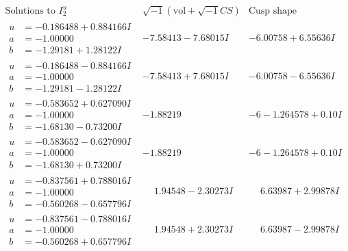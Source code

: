 \documentclass[1p]{elsarticle_modified}
\theoremstyle{definition}
\newcommand{\I}{\sqrt{-1}}
\begin{document}
$$\begin{array}{c|c|c}  
\text{Solutions to }I^u_{2}& \I (\text{vol} + \sqrt{-1}CS) & \text{Cusp shape}\\
 \hline 
\begin{aligned}
u &= -0.186488 + 0.884166 I \\
a &= -1.00000\phantom{ +0.000000I} \\
b &= -1.29181 + 1.28122 I\end{aligned}
 & -7.58413 - 7.68015 I & -6.00758 + 6.55636 I \\ \hline\begin{aligned}
u &= -0.186488 - 0.884166 I \\
a &= -1.00000\phantom{ +0.000000I} \\
b &= -1.29181 - 1.28122 I\end{aligned}
 & -7.58413 + 7.68015 I & -6.00758 - 6.55636 I \\ \hline\begin{aligned}
u &= -0.583652 + 0.627090 I \\
a &= -1.00000\phantom{ +0.000000I} \\
b &= -1.68130 - 0.73200 I\end{aligned}
 & -1.88219\phantom{ +0.000000I} &                  -6
-1.264578 + 0. 10   I\phantom{ +0.000000I} \\ \hline\begin{aligned}
u &= -0.583652 - 0.627090 I \\
a &= -1.00000\phantom{ +0.000000I} \\
b &= -1.68130 + 0.73200 I\end{aligned}
 & -1.88219\phantom{ +0.000000I} &                  -6
-1.264578 + 0. 10   I\phantom{ +0.000000I} \\ \hline\begin{aligned}
u &= -0.837561 + 0.788016 I \\
a &= -1.00000\phantom{ +0.000000I} \\
b &= -0.560268 - 0.657796 I\end{aligned}
 & \phantom{-}1.94548 - 2.30273 I & \phantom{-}6.63987 + 2.99878 I \\ \hline\begin{aligned}
u &= -0.837561 - 0.788016 I \\
a &= -1.00000\phantom{ +0.000000I} \\
b &= -0.560268 + 0.657796 I\end{aligned}
 & \phantom{-}1.94548 + 2.30273 I & \phantom{-}6.63987 - 2.99878 I \\ \hline\begin{aligned}

\end{aligned}
\end{array}$$
\end{document}
